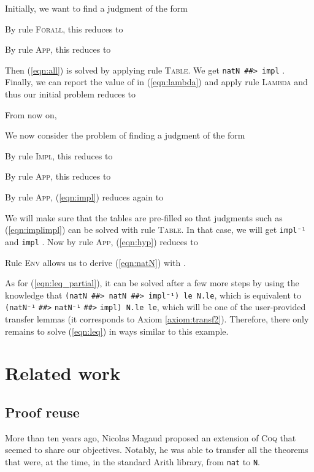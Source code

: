 \documentclass{llncs}
\begin{document}
\begin{example}
    Initially, we want to find a judgment of the form
    
    By rule \textsc{Forall}, this reduces to
    
    By rule \textsc{App}, this reduces to
    
    
    Then (\ref{eqn:all}) is solved by applying rule \textsc{Table}.
    We get  \verb|natN ##> impl| .
    Finally, we can report the value of  in (\ref{eqn:lambda})
    and apply rule \textsc{Lambda} and thus our initial problem reduces
    to
    

    From now on,
    
    We now consider the problem of finding a judgment of the form
    
    By rule \textsc{Impl}, this reduces to
    
    By rule \textsc{App}, this reduces to
    
    
    By rule \textsc{App}, (\ref{eqn:impl}) reduces again to
    
    
    We will make sure that
    the tables are pre-filled so that judgments such as
    (\ref{eqn:implimpl}) can be solved with rule \textsc{Table}.
    In that case, we will get  \verb|impl⁻¹| and
     \verb|impl| .
    Now by rule \textsc{App}, (\ref{eqn:hyp}) reduces to
    
    
    Rule \textsc{Env} allows us to derive (\ref{eqn:natN}) with
    .

    As for (\ref{eqn:leq_partial}), it can be solved after a few
    more steps by using the knowledge that
    \verb|(natN ##> natN ##> impl⁻¹) le N.le|, which is equivalent to
    \verb|(natN⁻¹| \verb|##>| \verb|natN⁻¹| \verb|##>| \verb|impl) N.le le|,
    which will be one of the user-provided transfer lemmas
    (it corresponds to Axiom \ref{axiom:transf2}).
    Therefore, there only remains to solve (\ref{eqn:leq}) in ways
    similar to this example.
\end{example}

\section{Related work}

\subsection{Proof reuse}

More than ten years ago, Nicolas Magaud \cite{Magaud2003} proposed
an extension of \textsc{Coq} that seemed to share our objectives.
Notably, he was able to transfer all the theorems that were,
at the time, in the standard Arith library, from \texttt{nat} to
\texttt{N}.
\end{document}
